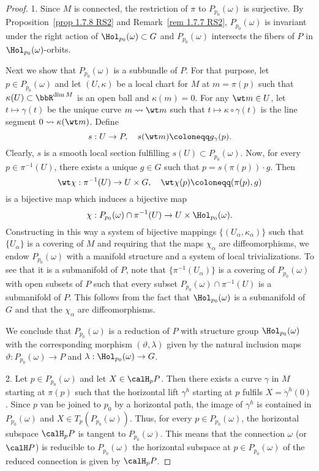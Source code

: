 \begin{proof}
    1. Since $M$ is connected, the restriction of $\pi$ to $P_{p_0}(\omega)$ is surjective. By Proposition~\ref{prop 1.7.8 RS2} and Remark~\ref{rem 1.7.7 RS2}, $P_{p_0}(\omega)$ is invariant under the right action of $\Hol_{p_0}(\omega)\subset G$ and $P_{p_0}(\omega)$ intersects the fibers of $P$ in $\Hol_{p_0}(\omega)$-orbits.

    Next we show that $P_{p_0}(\omega)$ is a subbundle of $P$. For that purpose, let $p\in P_{p_0}(\omega)$ and let $(U,\kappa)$ be a local chart for $M$ at $m=\pi(p)$ such that $\kappa(U)\subset\bbR^{\dim M}$ is an open ball and $\kappa(m)=0$. For any $\wt m\in U$, let $t\mapsto \gamma(t)$ be the unique curve  $m\leadsto \wt m$ such that $t\mapsto \kappa\circ\gamma(t)$ is the line segment $0\leadsto \kappa(\wt m)$. Define
    \[s:U\to P,\quad s(\wt m)\coloneqq g_{\gamma}(p).\]
    Clearly, $s$ is a smooth local section fulfilling $s(U)\subset P_{p_0}(\omega)$. Now, for every $p\in \pi^{-1}(U)$, there exists a unique $g\in G$ such that $p=s(\pi(p))\cdot g$. Then
    \[\wt\chi:\pi^{-1}(U)\to U\times G,\quad \wt\chi(p)\coloneqq (\pi(p),g)\]
    is a bijective map which induces a bijective map
    \[\chi:P_{p_0}(\omega)\cap\pi^{-1}(U)\to U\times \Hol_{p_0}(\omega).\]
    Constructing in this way a system of bijective mappings $\{(U_\alpha,\kappa_\alpha)\}$ such that $\{U_\alpha\}$ is a covering of $M$ and requiring that the maps $\chi_\alpha$ are diffeomorphisms, we endow $P_{p_0}(\omega)$ with a manifold structure and a system of local trivializations. To see that it is a submanifold of $P$, note that $\{\pi^{-1}(U_\alpha)\}$ is a covering of $P_{p_0}(\omega)$ with open subsets of $P$ such that every subset $P_{p_0}(\omega)\cap\pi^{-1}(U)$ is a submanifold of $P$. This follows from the fact that $\Hol_{p_0}(\omega)$ is a submanifold of $G$ and that the $\chi_\alpha$ are diffeomorphisms.

    We conclude that $P_{p_0}(\omega)$ is a reduction of $P$ with structure group $\Hol_{p_0}(\omega)$ with the corresponding morphism $(\vartheta,\lambda)$ given by the natural inclusion maps $\vartheta:P_{p_0}(\omega)\to P$ and $\lambda:\Hol_{p_0}(\omega)\to G$.

    2. Let $p\in P_{p_0}(\omega)$ and let $X\in\calH_p P$. Then there exists a curve $\gamma$ in $M$ starting at $\pi(p)$ such that the horizontal lift $\gamma^h$ starting at $p$ fulfils $X=\dot\gamma^h(0)$. Since $p$ van be joined to $p_0$ by a horizontal path, the image of $\gamma^h$ is contained in $P_{p_0}(\omega)$ and $X\in T_p(P_{p_0}(\omega))$. Thus, for every $p\in P_{p_0}(\omega)$, the horizontal subspace $\calH_p P$ is tangent to $P_{p_0}(\omega)$. This means that the connection $\omega$ (or $\calH P$) is reducible to $P_{p_0}(\omega)$ the horizontal subspace at $p\in P_{p_0}(\omega)$ of the reduced connection is given by $\calH_p P$.
\end{proof}

